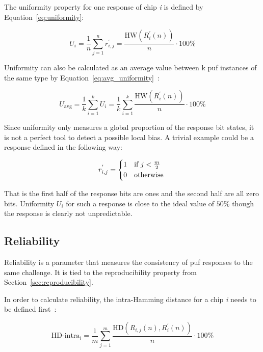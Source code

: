 The uniformity property for one response of chip \emph{i} is defined by Equation~\ref{eq:uniformity}:

\begin{equation}\label{eq:uniformity}
    U_{i} = \frac{1}{n}\sum_{j=1}^{n}r_{i,j}^{'} = \frac{\textrm{HW}(R_{i}^{'}(n))}{n} \cdot 100\% 
\end{equation}

Uniformity can also be calculated as an average value between k \gls{puf} instances of the same type by Equation~\ref{eq:avg_uniformity}~\cite{Maiti2011}:

\begin{equation}\label{eq:avg_uniformity}
    U_{\textrm{avg}} = \frac{1}{k}\sum_{i=1}^{k}U_{i} = \frac{1}{k}\sum_{i=1}^{k}\frac{\textrm{HW}(R_{i}^{'}(n))}{n} \cdot 100\%
\end{equation}

Since uniformity only measures a global proportion of the response bit states, it is not a perfect tool to detect a possible local bias. A trivial example could be a response defined in the following way:

\begin{equation}
    r_{i, j}^{'} =
    \begin{cases*}
        1 & if $j < \frac{m}{2}$ \\
        0 & otherwise
    \end{cases*}
\end{equation}

That is the first half of the response bits are ones and the second half are all zero bits. Uniformity $U_{i}$ for such a response is close to the ideal value of $50\%$ though the response is clearly not unpredictable.

\subsection{Reliability}\label{sec:reliability}

Reliability is a parameter that measures the consistency of \gls{puf} responses to the same challenge. It is tied to the reproducibility property from Section~\ref{sec:reproducibility}.

In order to calculate reliability, the intra-Hamming distance for a chip \emph{i} needs to be defined first~\cite{Maiti2011}: 

\begin{equation}\label{eq:hd_intra}
    \textrm{HD-intra}_{i} = \frac{1}{m} \sum_{j=1}^{m}\frac{\textrm{HD}(R_{i,j}(n), R_{i}^{'}(n))}{n} \cdot 100 \%
\end{equation}

